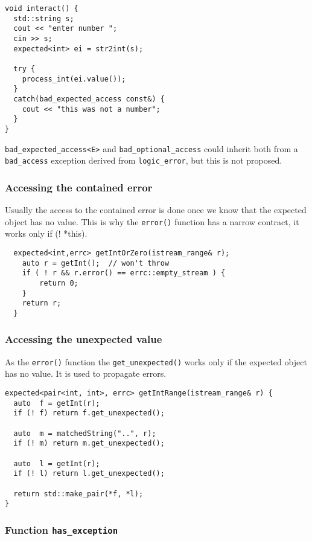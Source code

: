 \documentclass[a4paper,10pt]{article}
\newcommand{\cpp}[1]{\lstinline{#1}}
\begin{document}
\begin{lstlisting}
void interact() {
  std::string s;
  cout << "enter number ";
  cin >> s;
  expected<int> ei = str2int(s);
  
  try {
    process_int(ei.value());
  }
  catch(bad_expected_access const&) {
    cout << "this was not a number";
  }
}
\end{lstlisting}

\cpp{bad_expected_access<E>} and \cpp{bad_optional_access} could inherit both from a \cpp{bad_access} exception derived from \cpp{logic_error}, but this is not proposed.

\subsubsection{Accessing the contained error}

Usually the access to the contained error is done once we know that the expected object has no value. This is why the \cpp{error()} function has a narrow contract, it works only if (! *this).

\begin{lstlisting}
  expected<int,errc> getIntOrZero(istream_range& r);
    auto r = getInt();  // won't throw
    if ( ! r && r.error() == errc::empty_stream ) {
        return 0;
    }
    return r;
  }
\end{lstlisting}


\subsubsection{Accessing the unexpected value}

As the \cpp{error()} function the \cpp{get_unexpected()} works only if the expected object has no value. It is used to propagate errors.

\begin{lstlisting}
expected<pair<int, int>, errc> getIntRange(istream_range& r) {
  auto  f = getInt(r);
  if (! f) return f.get_unexpected();

  auto  m = matchedString("..", r);
  if (! m) return m.get_unexpected();

  auto  l = getInt(r);
  if (! l) return l.get_unexpected();

  return std::make_pair(*f, *l);
}
\end{lstlisting}

\subsubsection{Function \cpp{has_exception}}
\end{document}
